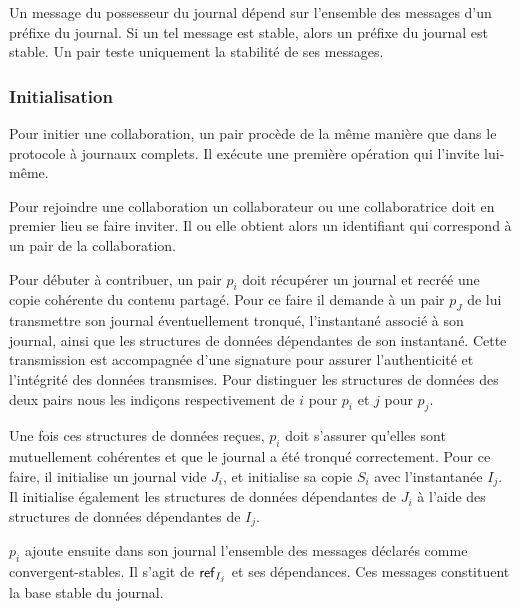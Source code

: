 Un message du possesseur du journal dépend sur l'ensemble des messages d'un préfixe du journal.
Si un tel message est stable, alors un préfixe du journal est stable.
Un pair teste uniquement la stabilité de ses messages.


\subsubsection{Initialisation}

Pour initier une collaboration, un pair procède de la même manière que dans le protocole à journaux complets.
Il exécute une première opération qui l'invite lui-même.

Pour rejoindre une collaboration un collaborateur ou une collaboratrice doit en premier lieu se faire inviter.
Il ou elle obtient alors un identifiant qui correspond à un pair de la collaboration.

Pour débuter à contribuer, un pair $p_i$ doit récupérer un journal et recréé une copie cohérente du contenu partagé.
Pour ce faire il demande à un pair $p_J$ de lui transmettre son journal éventuellement tronqué, l'instantané associé à son journal, ainsi que les structures de données dépendantes de son instantané.
Cette transmission est accompagnée d'une signature pour assurer l'authenticité et l'intégrité des données transmises.
Pour distinguer les structures de données des deux pairs nous les indiçons respectivement de $i$ pour $p_i$ et $j$ pour $p_j$.

%
%

Une fois ces structures de données reçues, $p_i$ doit s'assurer qu'elles sont mutuellement cohérentes et que le journal a été tronqué correctement.
Pour ce faire, il initialise un journal vide $J_i$, et initialise sa copie $S_i$ avec l'instantanée $I_j$.
Il initialise également les structures de données dépendantes de $J_i$ à l'aide des structures de données dépendantes de $I_j$.

$p_i$ ajoute ensuite dans son journal l'ensemble des messages déclarés comme convergent-stables.
Il s'agit de $\operatorname{\mathsf{ref}}_{I_j}$ et ses dépendances.
Ces messages constituent la base stable du journal.

